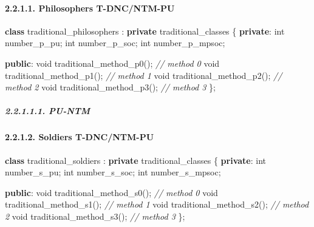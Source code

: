 \documentclass[
]{article}
\newenvironment{Shaded}{}{}
\newcommand{\CommentTok}[1]{\textcolor[rgb]{0.38,0.63,0.69}{\textit{#1}}}
\newcommand{\DataTypeTok}[1]{\textcolor[rgb]{0.56,0.13,0.00}{#1}}
\newcommand{\KeywordTok}[1]{\textcolor[rgb]{0.00,0.44,0.13}{\textbf{#1}}}
\newcommand{\NormalTok}[1]{#1}
\begin{document}
\hypertarget{philosophers-t-dncntm-pu}{%
\paragraph{2.2.1.1. Philosophers
T-DNC/NTM-PU}\label{philosophers-t-dncntm-pu}}

\begin{Shaded}
\begin{Highlighting}[]
\KeywordTok{class}\NormalTok{ traditional\_philosophers : }\KeywordTok{private}\NormalTok{ traditional\_classes \{}
   \KeywordTok{private}\NormalTok{:}
      \DataTypeTok{int}\NormalTok{ number\_p\_pu;}
      \DataTypeTok{int}\NormalTok{ number\_p\_soc;}
      \DataTypeTok{int}\NormalTok{ number\_p\_mpsoc;}

   \KeywordTok{public}\NormalTok{:}
      \DataTypeTok{void}\NormalTok{ traditional\_method\_p0();  }\CommentTok{// method 0}
      \DataTypeTok{void}\NormalTok{ traditional\_method\_p1();  }\CommentTok{// method 1}
      \DataTypeTok{void}\NormalTok{ traditional\_method\_p2();  }\CommentTok{// method 2}
      \DataTypeTok{void}\NormalTok{ traditional\_method\_p3();  }\CommentTok{// method 3}
\NormalTok{\};}
\end{Highlighting}
\end{Shaded}

\hypertarget{pu-ntm}{%
\subparagraph{2.2.1.1.1. PU-NTM}\label{pu-ntm}}

\hypertarget{soldiers-t-dncntm-pu}{%
\paragraph{2.2.1.2. Soldiers T-DNC/NTM-PU}\label{soldiers-t-dncntm-pu}}

\begin{Shaded}
\begin{Highlighting}[]
\KeywordTok{class}\NormalTok{ traditional\_soldiers : }\KeywordTok{private}\NormalTok{ traditional\_classes \{}
   \KeywordTok{private}\NormalTok{:}
      \DataTypeTok{int}\NormalTok{ number\_s\_pu;}
      \DataTypeTok{int}\NormalTok{ number\_s\_soc;}
      \DataTypeTok{int}\NormalTok{ number\_s\_mpsoc;}

   \KeywordTok{public}\NormalTok{:}
      \DataTypeTok{void}\NormalTok{ traditional\_method\_s0();  }\CommentTok{// method 0}
      \DataTypeTok{void}\NormalTok{ traditional\_method\_s1();  }\CommentTok{// method 1}
      \DataTypeTok{void}\NormalTok{ traditional\_method\_s2();  }\CommentTok{// method 2}
      \DataTypeTok{void}\NormalTok{ traditional\_method\_s3();  }\CommentTok{// method 3}
\NormalTok{\};}
\end{Highlighting}
\end{Shaded}
\end{document}
